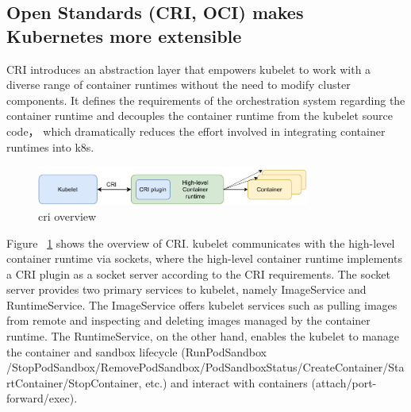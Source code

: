 \subsection{Open Standards (CRI\cite*{cri-interface}, OCI\cite*{oci-spec}) makes Kubernetes more extensible}

CRI introduces an abstraction layer that empowers kubelet to work with a diverse range of container runtimes without the need to modify cluster components. It defines the requirements of the 
orchestration system regarding the container runtime and decouples the container runtime from the kubelet source code， which dramatically reduces the effort involved in integrating container 
runtimes into k8s\cite*{cri-interface}.

\begin{figure}[H]
    \centering
    \includegraphics[width=0.8\textwidth]{images/cri_overviwe.pdf}
    \caption[cri overview]{cri overview}
    \label{fig:cri_overviwe}
  \end{figure}


Figure ~\ref{fig:cri_overviwe} shows the overview of CRI. kubelet communicates with the high-level container runtime via sockets, where the high-level container runtime implements a CRI plugin as a socket server according to the CRI 
requirements. The socket server provides two primary services to kubelet, namely ImageService and RuntimeService. The ImageService offers kubelet services such as pulling images from remote and 
inspecting and deleting images managed by the container runtime. The RuntimeService, on the other hand, enables the kubelet to manage the container and sandbox lifecycle 
(RunPodSandbox /StopPodSandbox/RemovePodSandbox/PodSandboxStatus/CreateContainer/StartContainer/StopContainer, etc.) 
and interact with containers (attach/port-forward/exec)\cite*{cri-interface}.

